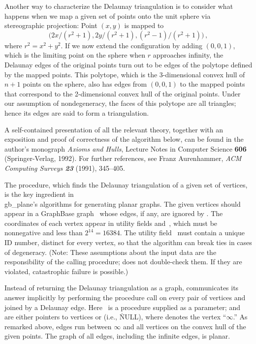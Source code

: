 Another way to characterize the Delaunay triangulation is to consider
what happens when we map a given set of
points onto the unit sphere via stereographic projection: Point $(x,y)$ is
mapped to
$$\bigl(2x/(r^2+1),2y/(r^2+1),(r^2-1)/(r^2+1)\bigr)\,,$$ where $r^2=x^2+y^2$.
If we now extend the configuration by adding $(0,0,1)$,
which is the limiting point on the sphere when $r$ approaches infinity,
the Delaunay edges of the original points
turn out to be edges of the polytope defined by the mapped
points. This polytope, which is the 3-dimensional convex hull of $n+1$ points
on the sphere, also has edges from $(0,0,1)$ to the mapped points
that correspond to the 2-dimensional convex hull of the original points. Under
our assumption of nondegeneracy, the faces of this polytope are all
triangles; hence its edges are said to form a triangulation.

A self-contained presentation of all the relevant theory, together with
an exposition and proof of correctness of the algorithm below, can be found
in the author's monograph {\sl Axioms and Hulls}, Lecture Notes in
Computer Science {\bf606} (Springer-Verlag, 1992).
For further references, see Franz Aurenhammer, {\sl ACM Computing Surveys\/
\bf23} (1991), 345--405.

\fi

The  procedure, which finds the Delaunay triangulation of
a given set of vertices, is the key ingredient in \\{gb\_plane}'s
algorithms for generating planar graphs. The given vertices should
appear in a GraphBase graph~ whose edges, if any, are ignored by
. The coordinates of each vertex appear in utility fields
 and~, which must be nonnegative and less
than
$2^{14}=16384$. The utility field~ must contain a unique ID
number, distinct for every vertex, so that the algorithm can break
ties in cases of degeneracy. (Note: These assumptions about the input
data are the responsibility of the calling procedure;  does
not
double-check them. If they are violated, catastrophic failure is possible.)

Instead of returning the Delaunay triangulation as a graph, 
communicates its answer implicitly by performing the procedure call
 on every pair of vertices  and~ joined by a
Delaunay edge.
Here ~is a procedure supplied as a parameter;  and~ are
either
pointers to vertices or \PB{$\NULL$} (i.e., \.{NULL}), where \PB{$\NULL$}
denotes the
vertex ``$\infty$.'' As remarked above, edges run between $\infty$ and all
vertices on the convex hull of the given points. The graph of all edges,
including the infinite edges, is planar.

